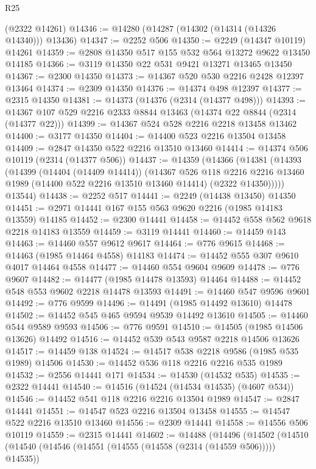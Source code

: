 \begin{lexlean}{R25}
\begin{coremodule}
    (@2322 @14261)
@14346 := @14280 (@14287 (@14302 (@14314 (@14326 @14340))) @13436)
@14347 := @2252 @506
@14350 := @2249 (@14347 @10119) @14261
@14359 := @2808 @14350 @517 @155 @532 @564 @13272 @9622 @13450 @14185
@14366 := @3119 @14350 @22 @531 @9421 @13271 @13465 @13450
@14367 := @2300 @14350
@14373 := @14367 @520 @530 @2216 @2428 @12397 @13464
@14374 := @2309 @14350
@14376 := @14374 @498 @12397
@14377 := @2315 @14350
@14381 := @14373 (@14376 (@2314 (@14377 @498)))
@14393 := @14367 @107 @529 @2216 @2333 @8844 @13463 (@14374 @22 @8844 (@2314 (@14377 @22)))
@14399 := @14367 @524 @528 @2216 @2218 @13458 @13462
@14400 := @3177 @14350
@14404 := @14400 @523 @2216 @13504 @13458
@14409 := @2847 @14350 @522 @2216 @13510 @13460
@14414 := @14374 @506 @10119 (@2314 (@14377 @506))
@14437 := @14359
    (@14366
      (@14381
        (@14393
          (@14399
            (@14404 (@14409 @14414))
            (@14367
              @526
              @118
              @2216
              @2216
              @13460
              @1989
              (@14400 @522 @2216 @13510 @13460 @14414)
              (@2322 @14350)))))
      @13544)
@14438 := @2252 @517
@14441 := @2249 (@14438 @13450) @14350
@14451 := @2971 @14441 @167 @155 @563 @9620 @2216 (@1985 @14183 @13559) @14185
@14452 := @2300 @14441
@14458 := @14452 @558 @562 @9618 @2218 @14183 @13559
@14459 := @3119 @14441
@14460 := @14459 @143
@14463 := @14460 @557 @9612 @9617
@14464 := @776 @9615
@14468 := @14463 (@1985 @14464 @4558) @14183
@14474 := @14452 @555 @307 @9610 @4017 @14464 @4558
@14477 := @14460 @554 @9604 @9609
@14478 := @776 @9607
@14482 := @14477 (@1985 @14478 @13593) @14464
@14488 := @14452 @548 @553 @9602 @2218 @14478 @13593
@14491 := @14460 @547 @9596 @9601
@14492 := @776 @9599
@14496 := @14491 (@1985 @14492 @13610) @14478
@14502 := @14452 @545 @465 @9594 @9539 @14492 @13610
@14505 := @14460 @544 @9589 @9593
@14506 := @776 @9591
@14510 := @14505 (@1985 @14506 @13626) @14492
@14516 := @14452 @539 @543 @9587 @2218 @14506 @13626
@14517 := @14459 @138
@14524 := @14517 @538 @2218 @9586 (@1985 @535 @1989) @14506
@14530 := @14452 @536 @118 @2216 @2216 @535 @1989
@14532 := @2556 @14441 @171
@14534 := @14530 (@14532 @535)
@14535 := @2322 @14441
@14540 := @14516 (@14524 (@14534 @14535) (@4607 @534))
@14546 := @14452 @541 @118 @2216 @2216 @13504 @1989
@14547 := @2847 @14441
@14551 := @14547 @523 @2216 @13504 @13458
@14555 := @14547 @522 @2216 @13510 @13460
@14556 := @2309 @14441
@14558 := @14556 @506 @10119
@14559 := @2315 @14441
@14602 := @14488
    (@14496
      (@14502
        (@14510
          (@14540 (@14546 (@14551 (@14555 (@14558 (@2314 (@14559 @506))))) @14535))

\end{coremodule}
\end{lexlean}
